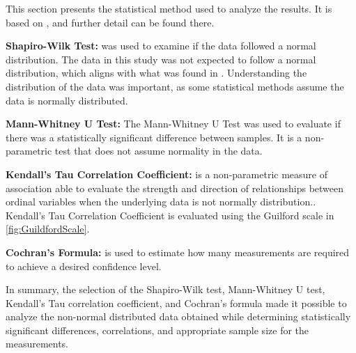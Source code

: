 

This section presents the statistical method used to analyze the results. It is based on \cite{biksbois}, and further detail can be found there.\newline %


\noindent\textbf{Shapiro-Wilk Test:} was used to examine if the data followed a normal distribution. %
The data in this study was not expected to follow a normal distribution, which aligns with what was found in \cite{biksbois}. Understanding the distribution of the data was important, as some statistical methods assume the data is normally distributed.\cite{razali2011power}\newline

\noindent\textbf{Mann-Whitney U Test:}
The Mann-Whitney U Test was used to evaluate if there was a statistically significant difference between samples. It is a non-parametric test that does not assume normality in the data.\cite{mann1947test}\newline


\noindent\textbf{Kendall's Tau Correlation Coefficient:} is a non-parametric measure of association able to evaluate the strength and direction of relationships between ordinal variables when the underlying data is not normally distribution.\cite{han1987non}. Kendall's Tau Correlation Coefficient is evaluated using the Guilford scale in \cref{fig:GuildfordScale}.\cite[219]{guilford1950fundamental}\newline


\noindent\textbf{Cochran's Formula:}
is used to estimate how many measurements are required to achieve a desired confidence level.\cite{Cochran}\newline


\noindent In summary, the selection of the Shapiro-Wilk test, Mann-Whitney U test, Kendall's Tau correlation coefficient, and Cochran's formula made it possible to analyze the non-normal distributed data obtained while determining statistically significant differences, correlations, and appropriate sample size for the measurements.
